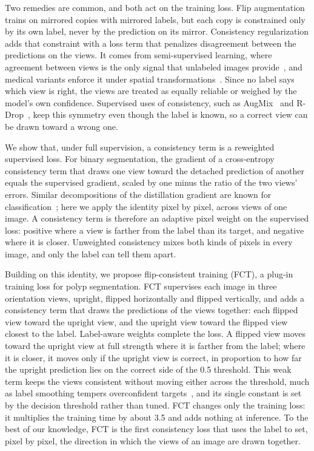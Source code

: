 Two remedies are common, and both act on the training loss. Flip augmentation trains on mirrored
copies with mirrored labels, but each copy is constrained only by its own label, never by the
prediction on its mirror. Consistency regularization adds that constraint with a loss term that
penalizes disagreement between the predictions on the views. It comes from semi-supervised
learning, where agreement between views is the only signal that unlabeled images
provide~\cite{laine2017temporal,tarvainen2017mean,sohn2020fixmatch}, and medical variants enforce it
under spatial transformations~\cite{bortsova2019consistency,li2021tcsm}. Since no label says which
view is right, the views are treated as equally reliable or weighed by the model's own confidence.
Supervised uses of consistency, such as AugMix~\cite{hendrycks2020augmix} and
R-Drop~\cite{liang2021rdrop}, keep this symmetry even though the label is known, so a correct view
can be drawn toward a wrong one.

We show that, under full supervision, a consistency term is a reweighted supervised loss. For binary
segmentation, the gradient of a cross-entropy consistency term that draws one view toward the detached
prediction of another equals the supervised gradient, scaled by one minus the ratio of the two views'
errors. Similar decompositions of the distillation gradient are known for
classification~\cite{furlanello2018born,tang2020understanding}; here we apply the identity pixel by
pixel, across views of one image. A consistency term is therefore an adaptive pixel weight on the
supervised loss: positive where a view is farther from the label than its target, and negative where
it is closer. Unweighted consistency mixes both kinds of pixels in every image, and only the label
can tell them apart.

Building on this identity, we propose flip-consistent training (FCT), a plug-in training loss for
polyp segmentation. FCT supervises each image in three orientation views, upright, flipped
horizontally and flipped vertically, and adds a consistency term that draws the predictions of the
views together: each flipped view toward the upright view, and the upright view toward the flipped view
closest to the label. Label-aware weights complete the loss. A flipped view moves toward the upright
view at full strength where it is farther from the label; where it is closer, it moves only if the
upright view is correct, in proportion to how far the upright prediction lies on the correct side of
the 0.5 threshold. This weak term keeps the views consistent without moving either across the
threshold, much as label smoothing tempers overconfident targets~\cite{yuan2020revisiting}, and its
single constant is set by the decision threshold rather than tuned. FCT changes only the training
loss: it multiplies the training time by about 3.5 and adds nothing at inference. To the best of our
knowledge, FCT is the first consistency loss that uses the label to set, pixel by pixel, the
direction in which the views of an image are drawn together.

